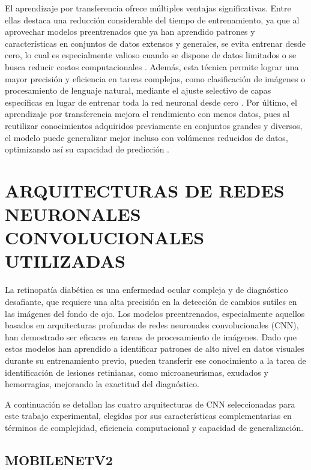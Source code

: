 El aprendizaje por transferencia ofrece múltiples ventajas significativas. Entre ellas destaca una reducción considerable del tiempo de entrenamiento, ya que al aprovechar modelos preentrenados que ya han aprendido patrones y características en conjuntos de datos extensos y generales, se evita entrenar desde cero, lo cual es especialmente valioso cuando se dispone de datos limitados o se busca reducir costos computacionales . Además, esta técnica permite lograr una mayor precisión y eficiencia en tareas complejas, como clasificación de imágenes o procesamiento de lenguaje natural, mediante el ajuste selectivo de capas específicas en lugar de entrenar toda la red neuronal desde cero . Por último, el aprendizaje por transferencia mejora el rendimiento con menos datos, pues al reutilizar conocimientos adquiridos previamente en conjuntos grandes y diversos, el modelo puede generalizar mejor incluso con volúmenes reducidos de datos, optimizando así su capacidad de predicción .

\section{ARQUITECTURAS DE REDES NEURONALES CONVOLUCIONALES UTILIZADAS}

La retinopatía diabética es una enfermedad ocular compleja y de diagnóstico desafiante, que requiere una alta precisión en la detección de cambios sutiles en las imágenes del fondo de ojo. Los modelos preentrenados, especialmente aquellos basados en arquitecturas profundas de redes neuronales convolucionales (CNN), han demostrado ser eficaces en tareas de procesamiento de imágenes. Dado que estos modelos han aprendido a identificar patrones de alto nivel en datos visuales durante su entrenamiento previo, pueden transferir ese conocimiento a la tarea de identificación de lesiones retinianas, como microaneurismas, exudados y hemorragias, mejorando la exactitud del diagnóstico.

A continuación se detallan las cuatro arquitecturas de CNN seleccionadas para este trabajo experimental, elegidas por sus características complementarias en términos de complejidad, eficiencia computacional y capacidad de generalización.

\subsection{MOBILENETV2}

